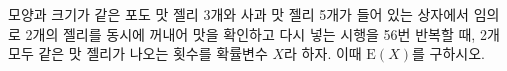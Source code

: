 모양과 크기가 같은 포도 맛 젤리 3개와 사과 맛 젤리 5개가 들어 있는 상자에서 임의로 2개의 젤리를 동시에 꺼내어 맛을 확인하고 다시 넣는 시행을 56번 반복할 때, 2개 모두 같은 맛 젤리가 나오는 횟수를 확률변수 $X$라 하자. 이때 $\mathrm{E}(X)$를 구하시오.
